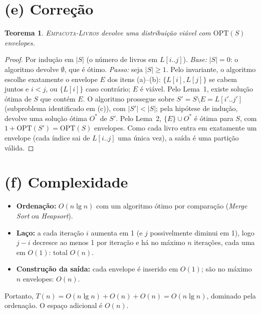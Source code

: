 \documentclass[11pt,a4paper]{article}
\newtheorem{teorema}{Teorema}
\begin{document}
\section*{(e) Correção}

\begin{teorema}
\textsc{Empacota-Livros} devolve uma distribuição viável com $\mathrm{OPT}(S)$ envelopes.
\end{teorema}

\begin{proof}
Por indução em $|S|$ (o número de livros em $L[i..j]$).
\emph{Base:} $|S| = 0$: o algoritmo devolve $\emptyset$, que é ótimo.
\emph{Passo:} seja $|S|\ge 1$. Pelo invariante, o algoritmo escolhe exatamente o
envelope $E$ dos itens (a)--(b): $\{L[i],L[j]\}$ se cabem juntos e $i<j$, ou
$\{L[i]\}$ caso contrário; $E$ é viável. Pelo Lema~1, existe solução ótima de $S$
que contém $E$. O algoritmo prossegue sobre $S' = S\setminus E = L[i'..j']$
(subproblema identificado em (c)), com $|S'| < |S|$; pela hipótese de indução,
devolve uma solução ótima $O^*$ de $S'$. Pelo Lema~2, $\{E\}\cup O^*$ é ótima para
$S$, com $1+\mathrm{OPT}(S') = \mathrm{OPT}(S)$ envelopes. Como cada livro entra em
exatamente um envelope (cada índice sai de $L[i..j]$ uma única vez), a saída é uma
partição válida.
\end{proof}

\section*{(f) Complexidade}

\begin{itemize}
  \item \textbf{Ordenação:} $O(n \lg n)$ com um algoritmo ótimo por comparação
        (\textit{Merge Sort} ou \textit{Heapsort}).
  \item \textbf{Laço:} a cada iteração $i$ aumenta em 1 (e $j$ possivelmente
        diminui em 1), logo $j-i$ decresce ao menos 1 por iteração e há no máximo
        $n$ iterações, cada uma em $O(1)$: total $O(n)$.
  \item \textbf{Construção da saída:} cada envelope é inserido em $O(1)$; são no
        máximo $n$ envelopes: $O(n)$.
\end{itemize}
Portanto, $T(n) = O(n\lg n) + O(n) + O(n) = O(n \lg n)$, dominado pela ordenação.
O espaço adicional é $O(n)$.
\end{document}
